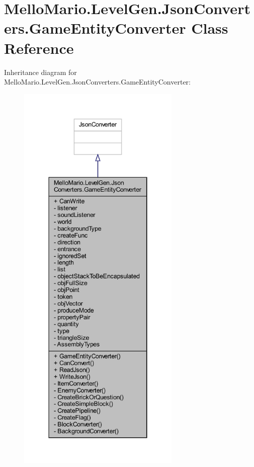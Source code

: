 \section{Mello\+Mario.\+Level\+Gen.\+Json\+Converters.\+Game\+Entity\+Converter Class Reference}
\label{classMelloMario_1_1LevelGen_1_1JsonConverters_1_1GameEntityConverter}


Inheritance diagram for Mello\+Mario.\+Level\+Gen.\+Json\+Converters.\+Game\+Entity\+Converter\+:
\nopagebreak
\begin{figure}[H]
\begin{center}
\leavevmode
\includegraphics[height=550pt]{classMelloMario_1_1LevelGen_1_1JsonConverters_1_1GameEntityConverter__inherit__graph}
\end{center}
\end{figure}


